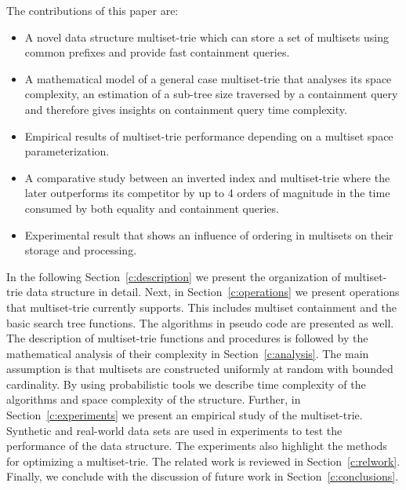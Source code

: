 % 
%
The contributions of this paper are:
\begin{itemize}
\item A novel data structure multiset-trie which can store a set of multisets using common prefixes and provide fast containment queries. 
\item A mathematical model of a general case multiset-trie that analyses its space complexity, an estimation of a sub-tree size traversed by a containment query and therefore gives insights on containment query time complexity.
\item Empirical results of multiset-trie performance depending on a multiset space parameterization.
\item A comparative study between an inverted index and multiset-trie where the later outperforms its competitor by up to 4 orders of magnitude in the time consumed by both equality and containment queries.
\item Experimental result that shows an influence of ordering in multisets on their storage and processing.
\end{itemize}
%

%

In the following Section~\ref{c:description} we present the organization of 
multiset-trie data structure in detail.
%
Next, in Section~\ref{c:operations} we present operations that multiset-trie currently 
supports. This includes multiset containment and the basic search tree functions. 
The algorithms in pseudo code are presented as well. 
%
The description of multiset-trie functions and procedures is followed by the 
mathematical analysis of their complexity in Section~\ref{c:analysis}. 
The main assumption is that multisets are constructed uniformly at random 
with bounded cardinality. By using probabilistic tools we describe time complexity of 
the algorithms and space complexity of the structure.
%
Further, in Section~\ref{c:experiments} we present an empirical study of the 
multiset-trie. Synthetic and real-world data sets are used in experiments to test the performance 
of the data structure. The experiments also highlight the methods for optimizing a multiset-trie.
%
The related work is reviewed in Section~\ref{c:relwork}. 
%
Finally, we conclude with the discussion of future work in Section~\ref{c:conclusions}.
%